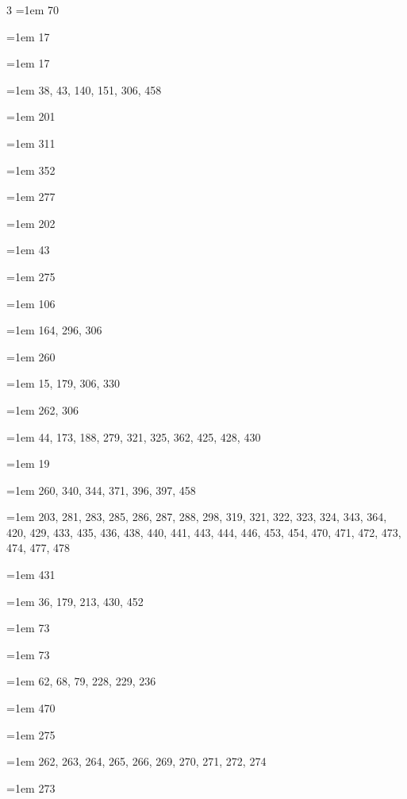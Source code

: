 \begin{multicols}{3}
\hangindent=1em  70\par
\hangindent=1em  17\par
\hangindent=1em  17\par
\hangindent=1em  38, 43, 140, 151, 306, 458\par
\hangindent=1em  201\par
\hangindent=1em  311\par
\hangindent=1em  352\par
\hangindent=1em  277\par
\hangindent=1em  202\par
\hangindent=1em  43\par
\hangindent=1em  275\par
\hangindent=1em  106\par
\hangindent=1em  164, 296, 306\par
\hangindent=1em  260\par
\hangindent=1em  15, 179, 306, 330\par
\hangindent=1em  262, 306\par
\hangindent=1em  44, 173, 188, 279, 321, 325, 362, 425, 428, 430\par
\hangindent=1em  19\par
\hangindent=1em  260, 340, 344, 371, 396, 397, 458\par
\hangindent=1em  203, 281, 283, 285, 286, 287, 288, 298, 319, 321, 322, 323, 324, 343, 364, 420, 429, 433, 435, 436, 438, 440, 441, 443, 444, 446, 453, 454, 470, 471, 472, 473, 474, 477, 478\par
\hangindent=1em  431\par
\hangindent=1em  36, 179, 213, 430, 452\par
\hangindent=1em  73\par
\hangindent=1em  73\par
\hangindent=1em  62, 68, 79, 228, 229, 236\par
\hangindent=1em  470\par
\hangindent=1em  275\par
\hangindent=1em  262, 263, 264, 265, 266, 269, 270, 271, 272, 274\par
\hangindent=1em  273\par

\end{multicols}
